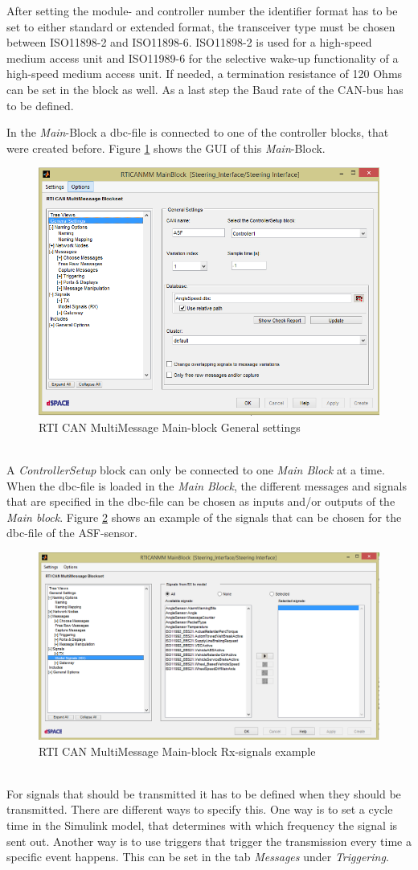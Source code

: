 \documentclass[ExampleMasters.tex]{subfiles}
\begin{document}
After setting the module- and controller number the identifier format has to be set to either standard or extended format, the transceiver type must be chosen between ISO11898-2 and ISO11898-6. ISO11898-2 is used for a high-speed medium access unit and ISO11989-6 for the selective wake-up functionality of a high-speed medium access unit. If needed, a termination resistance of 120 Ohms can be set in the block as well. As a last step the Baud rate of the \gls{CAN}-bus has to be defined.




In the \textit{Main}-Block a \gls{dbc}-file is connected to one of the controller blocks, that were created before. Figure \ref{fig:RTI_Main} shows the \gls{GUI} of this \textit{Main}-Block. 
\begin{figure}[!htb]
	\centering
	\includegraphics[width=0.5\linewidth]{figures/RTI_Main}
	
	\caption{\gls{RTI} \gls{CAN} MultiMessage Main-block General settings}
	\label{fig:RTI_Main}
\end{figure} \\
A \textit{ControllerSetup} block can only be connected to one \textit{Main Block} at a time. When the \gls{dbc}-file is loaded in the \textit{Main Block}, the different messages and signals that are specified in the \gls{dbc}-file can be chosen as inputs and/or outputs of the \textit{Main block}. Figure \ref{fig:RTI_Main_signals} shows an example of the signals that can be chosen for the \gls{dbc}-file of the \gls{ASF}-sensor.  
\begin{figure}[!htb]
	\centering
	\includegraphics[width=0.5\linewidth]{figures/RTI_Main_signals}
	
	\caption{\gls{RTI} \gls{CAN} MultiMessage Main-block Rx-signals example}
	\label{fig:RTI_Main_signals}
\end{figure} \\
For signals that should be transmitted it has to be defined when they should be transmitted. There are different ways to specify this. One way is to set a cycle time in the Simulink model, that determines with which frequency the signal is sent out. Another way is to use triggers that trigger the transmission every time a specific event happens. This can be set in the tab \textit{Messages} under \textit{Triggering}.
\end{document}
